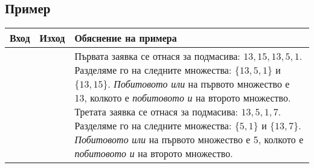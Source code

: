 \documentclass[12pt]{article}
\begin{document}
\subsection*{Пример}
\begin{table}[hbtp]
\centering
\setlength\extrarowheight{2pt}
\begin{tabulary}{1.0\textwidth}{ |l|l|J| }
\hline
    \textbf{Вход} & \textbf{Изход} & \textbf{Обяснение на примера} \\
\hline
    \texttt{} & 
    \texttt{} & 
	Първата заявка се отнася за подмасива: $13, 15, 13, 5, 1$. Разделяме го на следните множества: $\{13, 5, 1\}$ и $\{13, 15\}$. \textit{Побитовото или} на първото множество е 13, колкото е \textit{побитовото и} на второто множество. \newline
    Третата заявка се отнася за подмасива: $13, 5, 1, 7$. Разделяме го на следните множества: $\{5, 1\}$ и $\{13, 7\}$. \textit{Побитовото или} на първото множество е 5, колкото е \textit{побитовото и} на второто множество. \\
\hline
\end{tabulary}
\end{table}
	
\end{document}
